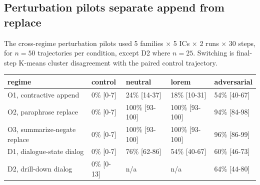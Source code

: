 \documentclass{article}
\theoremstyle{plain}
\theoremstyle{definition}
\begin{document}
\subsection{Perturbation pilots separate append from replace}

The cross-regime perturbation pilots used 5 families × 5 ICs × 2 runs × 30 steps, for $n=50$ trajectories per condition, except D2 where $n=25$. Switching is final-step K-means cluster disagreement with the paired control trajectory.

\begin{table}[h!]
\centering
\small
\begin{tabularx}{\textwidth}{lYYYY}
\toprule
regime & control & neutral & lorem & adversarial \\
\midrule
O1, contractive append & 0\% [0-7] & 24\% [14-37] & 18\% [10-31] & 54\% [40-67] \\
O2, paraphrase replace & 0\% [0-7] & 100\% [93-100] & 100\% [93-100] & 94\% [84-98] \\
O3, summarize-negate replace & 0\% [0-7] & 100\% [93-100] & 100\% [93-100] & 96\% [86-99] \\
D1, dialogue-state dialog & 0\% [0-7] & 76\% [62-86] & 54\% [40-67] & 60\% [46-73] \\
D2, drill-down dialog & 0\% [0-13] & n/a & n/a & 64\% [44-80] \\
\bottomrule
\end{tabularx}
\end{table}
\end{document}

